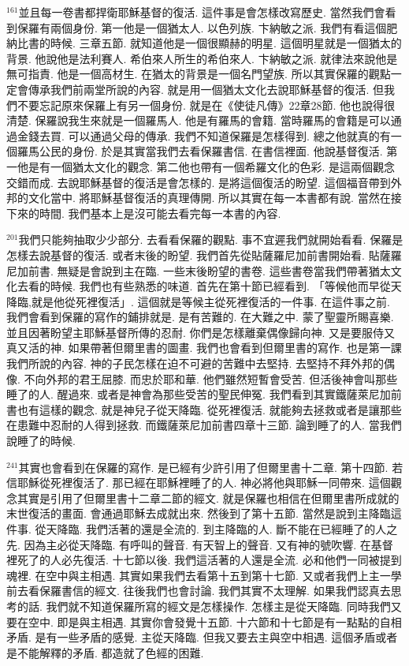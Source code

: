 \documentclass{book}
\begin{document}
$^{161}$並且每一卷書都捍衛耶穌基督的復活.
這件事是會怎樣改寫歷史.
當然我們會看到保羅有兩個身份.
第一他是一個猶太人.
以色列族.
卞納敏之派.
我們有看這個肥納比書的時候.
三章五節.
就知道他是一個很顯赫的明星.
這個明星就是一個猶太的背景.
他說他是法利賽人.
希伯來人所生的希伯來人.
卞納敏之派.
就律法來說他是無可指責.
他是一個高材生.
在猶太的背景是一個名門望族.
所以其實保羅的觀點一定會傳承我們前兩堂所說的內容.
就是用一個猶太文化去說耶穌基督的復活.
但我們不要忘記原來保羅上有另一個身份.
就是在《使徒凡傳》22章28節.
他也說得很清楚.
保羅說我生來就是一個羅馬人.
他是有羅馬的會籍.
當時羅馬的會籍是可以通過金錢去買.
可以通過父母的傳承.
我們不知道保羅是怎樣得到.
總之他就真的有一個羅馬公民的身份.
於是其實當我們去看保羅書信.
在書信裡面.
他說基督復活.
第一他是有一個猶太文化的觀念.
第二他也帶有一個希羅文化的色彩.
是這兩個觀念交錯而成.
去說耶穌基督的復活是會怎樣的.
是將這個復活的盼望.
這個福音帶到外邦的文化當中.
將耶穌基督復活的真理傳開.
所以其實在每一本書都有說.
當然在接下來的時間.
我們基本上是沒可能去看完每一本書的內容.

$^{201}$我們只能夠抽取少少部分.
去看看保羅的觀點.
事不宜遲我們就開始看看.
保羅是怎樣去說基督的復活.
或者末後的盼望.
我們首先從貼薩羅尼加前書開始看.
貼薩羅尼加前書.
無疑是會說到主在臨.
一些末後盼望的書卷.
這些書卷當我們帶著猶太文化去看的時候.
我們也有些熟悉的味道.
首先在第十節已經看到.
「等候他而早從天降臨,就是他從死裡復活」.
這個就是等候主從死裡復活的一件事.
在這件事之前.
我們會看到保羅的寫作的鋪排就是.
是有苦難的.
在大難之中.
蒙了聖靈所賜喜樂.
並且因著盼望主耶穌基督所傳的忍耐.
你們是怎樣離棄偶像歸向神.
又是要服侍又真又活的神.
如果帶著但爾里書的圖畫.
我們也會看到但爾里書的寫作.
也是第一課我們所說的內容.
神的子民怎樣在迫不可避的苦難中去堅持.
去堅持不拜外邦的偶像.
不向外邦的君王屈膝.
而忠於耶和華.
他們雖然短暫會受苦.
但活後神會叫那些睡了的人.
醒過來.
或者是神會為那些受苦的聖民伸冤.
我們看到其實鐵薩萊尼加前書也有這樣的觀念.
就是神兒子從天降臨.
從死裡復活.
就能夠去拯救或者是讓那些在患難中忍耐的人得到拯救.
而鐵薩萊尼加前書四章十三節.
論到睡了的人.
當我們說睡了的時候.

$^{241}$其實也會看到在保羅的寫作.
是已經有少許引用了但爾里書十二章.
第十四節.
若信耶穌從死裡復活了.
那已經在耶穌裡睡了的人.
神必將他與耶穌一同帶來.
這個觀念其實是引用了但爾里書十二章二節的經文.
就是保羅也相信在但爾里書所成就的末世復活的畫面.
會通過耶穌去成就出來.
然後到了第十五節.
當然是說到主降臨這件事.
從天降臨.
我們活著的還是全流的.
到主降臨的人.
斷不能在已經睡了的人之先.
因為主必從天降臨.
有呼叫的聲音.
有天智上的聲音.
又有神的號吹響.
在基督裡死了的人必先復活.
十七節以後.
我們這活著的人還是全流.
必和他們一同被提到魂裡.
在空中與主相遇.
其實如果我們去看第十五到第十七節.
又或者我們上主一學前去看保羅書信的經文.
往後我們也會討論.
我們其實不太理解.
如果我們認真去思考的話.
我們就不知道保羅所寫的經文是怎樣操作.
怎樣主是從天降臨.
同時我們又要在空中.
即是與主相遇.
其實你會發覺十五節.
十六節和十七節是有一點點的自相矛盾.
是有一些矛盾的感覺.
主從天降臨.
但我又要去主與空中相遇.
這個矛盾或者是不能解釋的矛盾.
都造就了色經的困難.
\end{document}
